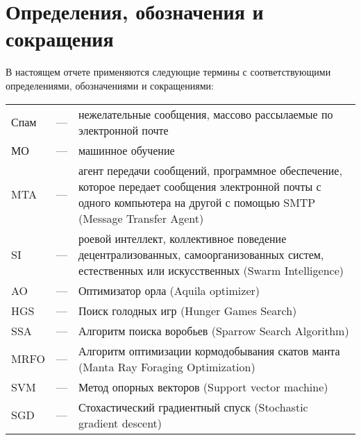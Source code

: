 \chapter*{Определения, обозначения и сокращения}

В настоящем отчете применяются следующие термины с соответствующими определениями, 
обозначениями и сокращениями:

\begingroup
\setlength{\baselineskip}{1.5em}
\begin{table}[ht]
    \begin{tabular}{ p{} p{} p{} } 
        Спам & — & нежелательные сообщения, массово рассылаемые по электронной почте \\
        МО & — & машинное обучение \\
        MTA & — & агент передачи сообщений, программное обеспечение, которое передает сообщения электронной почты с одного компьютера на другой с помощью SMTP (Message Transfer Agent) \\
        SI & — & роевой интеллект, коллективное поведение 
        децентрализованных, самоорганизованных систем, естественных или 
        искусственных (Swarm Intelligence) \\
        AO & — & Оптимизатор орла (Aquila optimizer) \\
        HGS & — & Поиск голодных игр (Hunger Games Search) \\
        SSA & — & Алгоритм поиска воробьев (Sparrow Search Algorithm) \\
        MRFO & — & Алгоритм оптимизации кормодобывания скатов манта (Manta Ray Foraging Optimization) \\
        SVM & — & Метод опорных векторов (Support vector machine) \\
        SGD & — & Стохастический градиентный спуск (Stochastic gradient descent) \\
    \end{tabular} 
\end{table}
\endgroup
